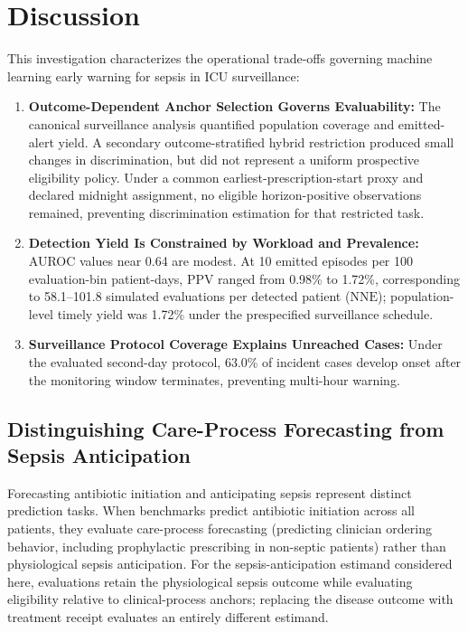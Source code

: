 \documentclass[12pt,a4paper]{article}
\begin{document}
\section{Discussion}
This investigation characterizes the operational trade-offs governing machine learning early warning for sepsis in ICU surveillance:
\begin{enumerate}
    \item \textbf{Outcome-Dependent Anchor Selection Governs Evaluability:} The canonical surveillance analysis quantified population coverage and emitted-alert yield. A secondary outcome-stratified hybrid restriction produced small changes in discrimination, but did not represent a uniform prospective eligibility policy. Under a common earliest-prescription-start proxy and declared midnight assignment, no eligible horizon-positive observations remained, preventing discrimination estimation for that restricted task.
    \item \textbf{Detection Yield Is Constrained by Workload and Prevalence:} AUROC values near 0.64 are modest. At 10 emitted episodes per 100 evaluation-bin patient-days, PPV ranged from 0.98\% to 1.72\%, corresponding to 58.1--101.8 simulated evaluations per detected patient ($\text{NNE}$); population-level timely yield was 1.72\% under the prespecified surveillance schedule.
    \item \textbf{Surveillance Protocol Coverage Explains Unreached Cases:} Under the evaluated second-day protocol, 63.0\% of incident cases develop onset after the monitoring window terminates, preventing multi-hour warning.
\end{enumerate}

\subsection{Distinguishing Care-Process Forecasting from Sepsis Anticipation}
Forecasting antibiotic initiation and anticipating sepsis represent distinct prediction tasks. When benchmarks predict antibiotic initiation across all patients, they evaluate care-process forecasting (predicting clinician ordering behavior, including prophylactic prescribing in non-septic patients) rather than physiological sepsis anticipation. For the sepsis-anticipation estimand considered here, evaluations retain the physiological sepsis outcome while evaluating eligibility relative to clinical-process anchors; replacing the disease outcome with treatment receipt evaluates an entirely different estimand.
\end{document}
